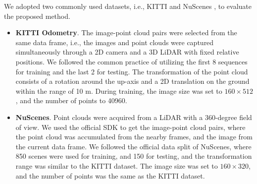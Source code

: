 \documentclass[lettersize,journal]{IEEEtran}
\begin{document}
We adopted two commonly used datasets, i.e., KITTI \cite{KITTI} and NuScenes \cite{NUSCENES}, to evaluate the proposed method.
\begin{itemize}
\item{\textbf{KITTI Odometry}\cite{KITTI}}.
The image-point cloud pairs were selected from the same data frame, i.e., the images and point clouds were captured simultaneously through a 2D camera and a 3D LiDAR with fixed relative positions. We followed the common practice \cite{DEEPI2P} of utilizing the first 8 sequences for training and the last 2 for testing. The transformation of the point cloud consists of a rotation around the up-axis and a 2D translation on the ground within the range of 10 m. During training, the image size was set to $160\times 512$, and the number of points to 40960.

\item{\textbf{NuScenes}\cite{NUSCENES}}.
Point clouds were acquired from a LiDAR with a 360-degree field of view. We used the official SDK to get the image-point cloud pairs, where the point cloud was accumulated from the nearby frames, and the image from the current data frame. We followed the official data split of NuScenes, where 850 scenes were used for training, and 150 for testing, and the transformation range was similar to the KITTI dataset. The image size was set to $160\times 320$, and the number of points was the same as the KITTI dataset.
\end{itemize}

\begin{table*}[h]
\centering
\renewcommand\arraystretch{1.5}
\end{table*}
\end{document}
